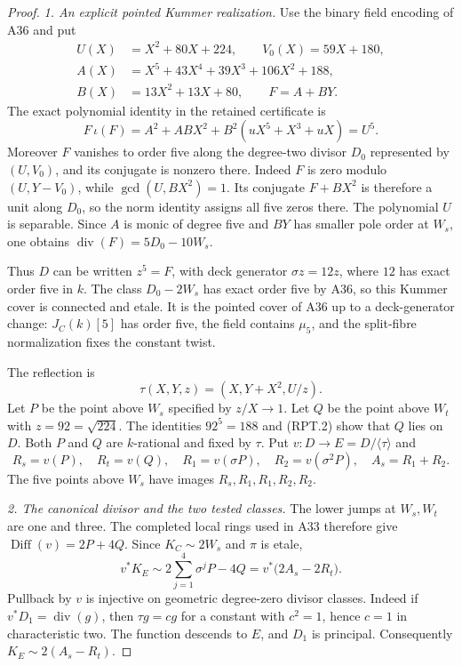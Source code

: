 \documentclass[11pt,a4paper]{article}
\begin{document}
\begin{proof}
\emph{1. An explicit pointed Kummer realization.}
Use the binary field encoding of A36 and put
\[
 \begin{aligned}
 U(X)&=X^2+80X+224,\qquad V_0(X)=59X+180,\\
 A(X)&=X^5+43X^4+39X^3+106X^2+188,\\
 B(X)&=13X^2+13X+80,\qquad F=A+BY.
 \end{aligned}
 \tag{RPT.1}
\]
The exact polynomial identity in the retained certificate is
\[
 F\,\iota(F)=A^2+ABX^2+B^2(uX^5+X^3+uX)=U^5.
 \tag{RPT.2}
\]
Moreover $F$ vanishes to order five along the degree-two divisor
$D_0$ represented by $(U,V_0)$, and its conjugate is nonzero
there. Indeed $F$ is zero modulo $(U,Y-V_0)$, while
$\gcd(U,BX^2)=1$. Its conjugate $F+BX^2$ is therefore a
unit along $D_0$, so the norm identity assigns all five zeros
there. The polynomial $U$ is separable.
Since $A$ is monic of degree five and $BY$ has smaller pole order
at $W_s$, one obtains
$\operatorname{div}(F)=5D_0-10W_s$.

Thus $D$ can be written $z^5=F$, with deck generator
$\sigma z=12z$, where $12$ has exact order five in $k$.
The class $D_0-2W_s$ has exact order five by A36, so this
Kummer cover is connected and etale. It is the pointed cover
of A36 up to a deck-generator change: $J_C(k)[5]$ has order
five, the field contains $\mu_5$, and the split-fibre
normalization fixes the constant twist.

The reflection is
\[
 \tau(X,Y,z)=(X,Y+X^2,U/z).
 \tag{RPT.3}
\]
Let $P$ be the point above $W_s$ specified by $z/X\to1$.
Let $Q$ be the point above $W_t$ with $z=92=\sqrt{224}$.
The identities $92^5=188$ and (RPT.2) show that $Q$ lies on
$D$. Both $P$ and $Q$ are $k$-rational and fixed by $\tau$.
Put $v:D\to E=D/\langle\tau\rangle$ and
\[
 R_s=v(P),\quad R_t=v(Q),\quad
 R_1=v(\sigma P),\quad R_2=v(\sigma^2P),\quad A_s=R_1+R_2.
 \tag{RPT.4}
\]
The five points above $W_s$ have images $R_s,R_1,R_1,R_2,R_2$.

\emph{2. The canonical divisor and the two tested classes.}
The lower jumps at $W_s,W_t$ are one and three. The completed
local rings used in A33 therefore give
$\operatorname{Diff}(v)=2P+4Q$.
Since $K_C\sim2W_s$ and $\pi$ is etale,
\[
             v^*K_E\sim2\sum_{j=1}^4\sigma^jP-4Q
                         =v^*\bigl(2A_s-2R_t\bigr).
 \tag{RPT.5}
\]
Pullback by $v$ is injective on geometric degree-zero divisor
classes. Indeed if $v^*D_1=\operatorname{div}(g)$, then
$\tau g=cg$ for a constant with $c^2=1$, hence $c=1$ in
characteristic two. The function descends to $E$, and $D_1$
is principal. Consequently $K_E\sim2(A_s-R_t)$.


\end{proof}
\end{document}
